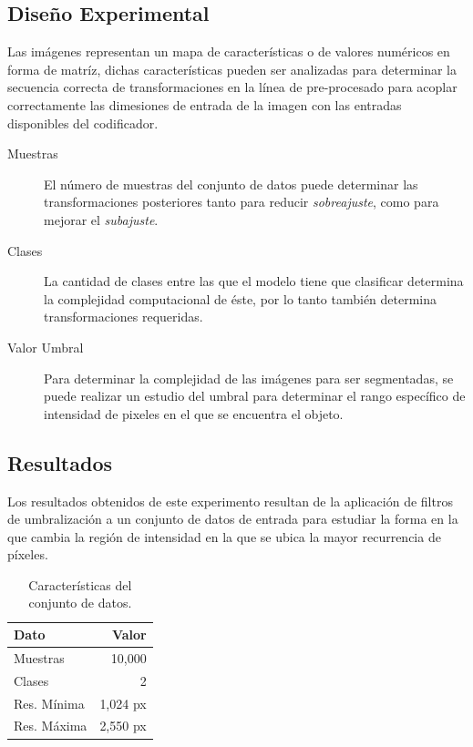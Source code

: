 \subsection{Diseño Experimental}
Las imágenes representan un mapa de características o de valores numéricos en forma de matríz, dichas características pueden ser analizadas para determinar la secuencia correcta de transformaciones en la línea de pre-procesado para acoplar correctamente las dimesiones de entrada de la imagen con las entradas disponibles del codificador.
\begin{description}
    \item[Muestras] El número de muestras del conjunto de datos puede determinar las transformaciones posteriores tanto para reducir \emph{sobreajuste}, como para mejorar el \emph{subajuste}.
    \item[Clases] La cantidad de clases entre las que el modelo tiene que clasificar determina la complejidad computacional de éste, por lo tanto también determina transformaciones requeridas.
    \item[Valor Umbral] Para determinar la complejidad de las imágenes para ser segmentadas, se puede realizar un estudio del umbral para determinar el rango específico de intensidad de pixeles en el que se encuentra el objeto.
\end{description}

\subsection{Resultados}
Los resultados obtenidos de este experimento resultan de la aplicación de filtros de umbralización a un conjunto de datos de entrada para estudiar la forma en la que cambia la región de intensidad en la que se ubica la mayor recurrencia de píxeles.

\begin{table}[b]
    \centering
    \caption{Características del conjunto de datos.}
    \begin{tabular}{|l| r|}
        \hline
        \bf{Dato} & \bf{Valor} \\
        \hline
        Muestras & 10,000 \\
        \hline
        Clases & 2 \\
        \hline
        Res. Mínima & 1,024 px \\
        \hline
        Res. Máxima & 2,550 px \\
        \hline
    \end{tabular}
\end{table}

